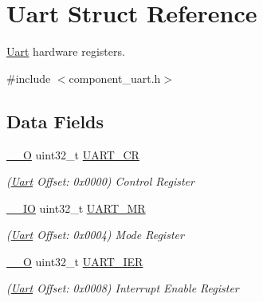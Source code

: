 \hypertarget{structUart}{}\section{Uart Struct Reference}
\label{structUart}


\mbox{\hyperlink{structUart}{Uart}} hardware registers.  




{\ttfamily \#include $<$component\+\_\+uart.\+h$>$}

\subsection*{Data Fields}
\begin{DoxyCompactItemize}
\item 
\mbox{\label{structUart_ae13e7a2b9f2c50ec62d1948dfd9743ad}} 
\mbox{\hyperlink{core__cm7_8h_a7e25d9380f9ef903923964322e71f2f6}{\+\_\+\+\_\+O}} uint32\+\_\+t \mbox{\hyperlink{structUart_ae13e7a2b9f2c50ec62d1948dfd9743ad}{U\+A\+R\+T\+\_\+\+CR}}
\begin{DoxyCompactList}\small\item\em (\mbox{\hyperlink{structUart}{Uart}} Offset\+: 0x0000) Control Register \end{DoxyCompactList}\item 
\mbox{\label{structUart_a778961c8c6beae2f23656db4a8445368}} 
\mbox{\hyperlink{core__cm7_8h_aec43007d9998a0a0e01faede4133d6be}{\+\_\+\+\_\+\+IO}} uint32\+\_\+t \mbox{\hyperlink{structUart_a778961c8c6beae2f23656db4a8445368}{U\+A\+R\+T\+\_\+\+MR}}
\begin{DoxyCompactList}\small\item\em (\mbox{\hyperlink{structUart}{Uart}} Offset\+: 0x0004) Mode Register \end{DoxyCompactList}\item 
\mbox{\label{structUart_a2ac09a8a1ccce4b81e5d367d6a34999f}} 
\mbox{\hyperlink{core__cm7_8h_a7e25d9380f9ef903923964322e71f2f6}{\+\_\+\+\_\+O}} uint32\+\_\+t \mbox{\hyperlink{structUart_a2ac09a8a1ccce4b81e5d367d6a34999f}{U\+A\+R\+T\+\_\+\+I\+ER}}
\begin{DoxyCompactList}\small\item\em (\mbox{\hyperlink{structUart}{Uart}} Offset\+: 0x0008) Interrupt Enable Register \end{DoxyCompactList}\item 

\end{DoxyCompactItemize}
